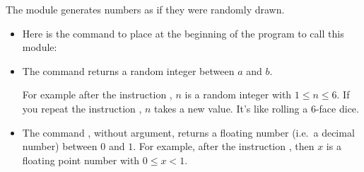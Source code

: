 \documentclass[11pt,class=report,crop=false]{standalone}
\begin{document}
\begin{cours}


The  module generates numbers as if they were randomly drawn.
\begin{itemize}
  \item Here is the command to place at the beginning of the program to call this module:
  
  \item The command  returns a random integer between $a$ and $b$.
  
  For example after the instruction , $n$ is a random integer with $1 \le n \le 6$.
  If you repeat the instruction , $n$ takes a new value. It's like rolling a 6-face dice.
  
  \item The command , without argument, returns a floating number (i.e.~a decimal number) between $0$ and $1$.  
  For example, after the instruction , then $x$ is a floating point number with $0 \le x < 1$.
\end{itemize}


\end{cours}


\end{document}
